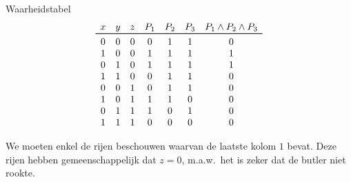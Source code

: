 \begin{oef}
\begin{opl}
\begin{samepage}
\begin{itemize}
\end{itemize}
\end{samepage}
\begin{samepage}
Waarheidstabel
\[
  \begin{array}{cccccccc}
    x & y & z & P_1 & P_2 & P_3 & P_1 \en P_2 \en P_3 \\
    \toprule
    0 & 0 & 0 & 0 & 1 & 1 & 0 \\
    1 & 0 & 0 & 1 & 1 & 1 & 1 \\
    0 & 1 & 0 & 1 & 1 & 1 & 1 \\
    1 & 1 & 0 & 0 & 1 & 1 & 0 \\
    0 & 0 & 1 & 0 & 1 & 1 & 0 \\
    1 & 0 & 1 & 1 & 1 & 0 & 0 \\
    0 & 1 & 1 & 1 & 0 & 1 & 0 \\
    1 & 1 & 1 & 0 & 0 & 0 & 0 \\
  \end{array}
\]
\end{samepage}
We moeten enkel de rijen beschouwen waarvan de laatste kolom $1$ bevat.
Deze rijen hebben gemeenschappelijk dat $z = 0$, m.a.w.\ het is
zeker dat de butler niet rookte.
\end{opl}
\end{oef}

